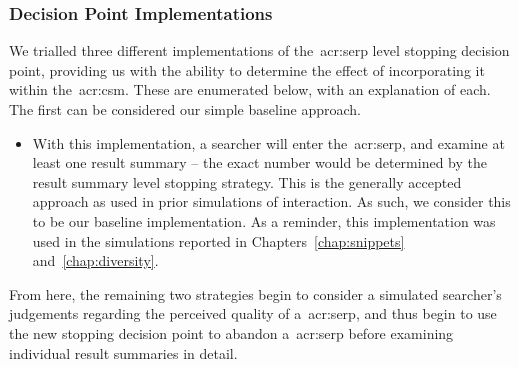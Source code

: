 \subsubsection{Decision Point Implementations}\label{sec:serp:method:serp_dp:implementations}
We trialled three different implementations of the~\gls{acr:serp} level stopping decision point, providing us with the ability to determine the effect of incorporating it within the~\gls{acr:csm}. These are enumerated below, with an explanation of each. The first can be considered our simple baseline approach.

\begin{itemize}
    \item{ With this implementation, a searcher will  enter the~\gls{acr:serp}, and examine at least one result summary -- the exact number would be determined by the result summary level stopping strategy. This is the generally accepted approach as used in prior simulations of interaction. As such, we consider this to be our baseline implementation. As a reminder, this implementation was used in the simulations reported in Chapters~\ref{chap:snippets} and~\ref{chap:diversity}.}
\end{itemize}

From here, the remaining two strategies begin to consider a simulated searcher's judgements regarding the perceived quality of a~\gls{acr:serp}, and thus begin to use the new stopping decision point to abandon a~\gls{acr:serp} before examining individual result summaries in detail.

